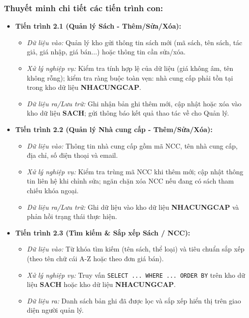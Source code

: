 \documentclass[12pt,a4paper]{article}
\begin{document}
\subsubsection*{Thuyết minh chi tiết các tiến trình con:}
\begin{itemize}
    \item \textbf{Tiến trình 2.1 (Quản lý Sách - Thêm/Sửa/Xóa):}
    \begin{itemize}
        \item \textit{Dữ liệu vào:} Quản lý kho gửi thông tin sách mới (mã sách, tên sách, tác giả, giá nhập, giá bán...) hoặc thông tin cần sửa/xóa.
        \item \textit{Xử lý nghiệp vụ:} Kiểm tra tính hợp lệ của dữ liệu (giá không âm, tên không rỗng); kiểm tra ràng buộc toàn vẹn: nhà cung cấp phải tồn tại trong kho dữ liệu \textbf{NHACUNGCAP}.
        \item \textit{Dữ liệu ra/Lưu trữ:} Ghi nhận bản ghi thêm mới, cập nhật hoặc xóa vào kho dữ liệu \textbf{SACH}; gửi thông báo kết quả thao tác về cho Quản lý.
    \end{itemize}

    \item \textbf{Tiến trình 2.2 (Quản lý Nhà cung cấp - Thêm/Sửa/Xóa):}
    \begin{itemize}
        \item \textit{Dữ liệu vào:} Thông tin nhà cung cấp gồm mã NCC, tên nhà cung cấp, địa chỉ, số điện thoại và email.
        \item \textit{Xử lý nghiệp vụ:} Kiểm tra trùng mã NCC khi thêm mới; cập nhật thông tin liên hệ khi chỉnh sửa; ngăn chặn xóa NCC nếu đang có sách tham chiếu khóa ngoại.
        \item \textit{Dữ liệu ra/Lưu trữ:} Ghi dữ liệu vào kho dữ liệu \textbf{NHACUNGCAP} và phản hồi trạng thái thực hiện.
    \end{itemize}

    \item \textbf{Tiến trình 2.3 (Tìm kiếm \& Sắp xếp Sách / NCC):}
    \begin{itemize}
        \item \textit{Dữ liệu vào:} Từ khóa tìm kiếm (tên sách, thể loại) và tiêu chuẩn sắp xếp (theo tên chữ cái A-Z hoặc theo đơn giá bán).
        \item \textit{Xử lý nghiệp vụ:} Truy vấn \texttt{SELECT ... WHERE ... ORDER BY} trên kho dữ liệu \textbf{SACH} hoặc kho dữ liệu \textbf{NHACUNGCAP}.
        \item \textit{Dữ liệu ra:} Danh sách bản ghi đã được lọc và sắp xếp hiển thị trên giao diện người quản lý.
    \end{itemize}
\end{itemize}
\end{document}

